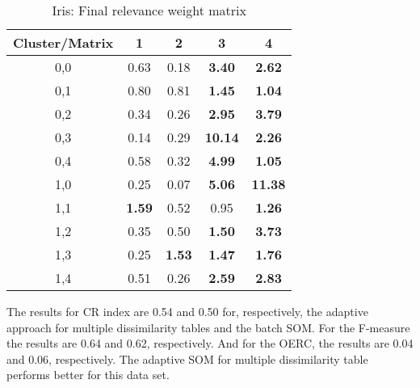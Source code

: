 \documentclass[10pt, conference, compsocconf]{IEEEtran}
\begin{document}
\begin{table}[!h]
\renewcommand{\arraystretch}{0.9}
\begin{center}
\caption{Iris: Final relevance weight matrix}
\begin{tabular}{|c|c|c|c|c|}
\hline
Cluster/Matrix & 1 & 2 & 3 & 4 \\ \hline
0,0 & 0.63 & 0.18 & \textbf{3.40} & \textbf{2.62} \\ \hline
0,1 & 0.80 & 0.81 & \textbf{1.45} & \textbf{1.04} \\ \hline
0,2 & 0.34 & 0.26 & \textbf{2.95} & \textbf{3.79} \\ \hline
0,3 & 0.14 & 0.29 & \textbf{10.14} & \textbf{2.26} \\ \hline
0,4 & 0.58 & 0.32 & \textbf{4.99} & \textbf{1.05} \\ \hline
1,0 & 0.25 & 0.07 & \textbf{5.06} & \textbf{11.38} \\ \hline
1,1 & \textbf{1.59} & 0.52 & 0.95 & \textbf{1.26} \\ \hline
1,2 & 0.35 & 0.50 & \textbf{1.50} & \textbf{3.73} \\ \hline
1,3 & 0.25 & \textbf{1.53} & \textbf{1.47} & \textbf{1.76} \\ \hline
1,4 & 0.51 & 0.26 & \textbf{2.59} & \textbf{2.83} \\ \hline

\end{tabular}
\label{iris_pesos}
\end{center}
\end{table}

The results for CR index are 0.54 and 0.50 for, respectively, the adaptive approach for multiple dissimilarity tables and the batch SOM. For the F-measure the results are 0.64 and 0.62, respectively. And for the OERC, the results are 0.04 and 0.06, respectively. The adaptive SOM for multiple dissimilarity table performs better for this data set.
\end{document}
